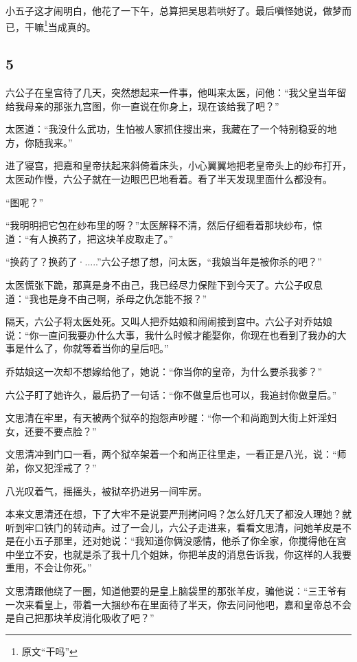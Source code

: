 小五子这才闹明白，他花了一下午，总算把吴思若哄好了。最后嗔怪她说，做梦而已，干嘛\footnote{原文“干吗”}当成真的。
\newline

{\centering\subsection{5}}

六公子在皇宫待了几天，突然想起来一件事，他叫来太医，问他：“我父皇当年留给我母亲的那张九宫图，你一直说在你身上，现在该给我了吧？”

太医道：“我没什么武功，生怕被人家抓住搜出来，我藏在了一个特别稳妥的地方，你随我来。”

进了寝宫，把嘉和皇帝扶起来斜倚着床头，小心翼翼地把老皇帝头上的纱布打开，太医动作慢，六公子就在一边眼巴巴地看着。看了半天发现里面什么都没有。

“图呢？”

“我明明把它包在纱布里的呀？”太医解释不清，然后仔细看着那块纱布，惊道：“有人换药了，把这块羊皮取走了。”

“换药了？换药了·.....”六公子想了想，问太医，“我娘当年是被你杀的吧？”

太医慌张下跪，那真是身不由己，我已经尽力保陛下到今天了。六公子叹息道：“我也是身不由己啊，杀母之仇怎能不报？”

隔天，六公子将太医处死。又叫人把乔姑娘和闹闹接到宫中。六公子对乔姑娘说：“你一直问我要办什么大事，我什么时候才能娶你，你现在也看到了我办的大事是什么了，你就等着当你的皇后吧。”

乔姑娘这一次却不想嫁给他了，她说：“你当你的皇帝，为什么要杀我爹？”

六公子盯了她许久，最后扔了一句话：“你不做皇后也可以，我追封你做皇后。”
\newline

文思清在牢里，有天被两个狱卒的抱怨声吵醒：“你一个和尚跑到大街上奸淫妇女，还要不要点脸？”

文思清冲到门口一看，两个狱卒架着一个和尚正往里走，一看正是八光，说：“师弟，你又犯淫戒了？”

八光叹着气，摇摇头，被狱卒扔进另一间牢房。

本来文思清还在想，下了大牢不是说要严刑拷问吗？怎么好几天了都没人理她？就听到牢口铁门的转动声。过了一会儿，六公子走进来，看看文思清，问她羊皮是不是在小五子那里，还对她说：“我知道你俩没感情，他杀了你全家，你搅得他在宫中坐立不安，也就是杀了我十几个姐妹，你把羊皮的消息告诉我，你这样的人我要重用，不会让你死。”

文思清跟他绕了一圈，知道他要的是皇上脑袋里的那张羊皮，骗他说：“三王爷有一次来看皇上，带着一大捆纱布在里面待了半天，你去问问他吧，嘉和皇帝总不会是自己把那块羊皮消化吸收了吧？”

